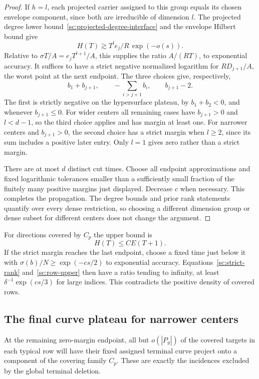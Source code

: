 \begin{proof}
If $h=l$, each projected carrier assigned to this group equals its chosen
envelope component, since both are irreducible of dimension $l$.
The projected degree lower bound~\eqref{sc:projected-degree-interface}
and the envelope Hilbert bound give
\[
 H(T)\gtrsim T^l e_j/R\,\exp(-o(s)).
\]
Relative to $\sigma T/A=e_jT^{l+1}/A$, this supplies the
ratio $A/(RT)$, to exponential accuracy.  It suffices to
have a strict negative normalized logarithm for
$R D_{j+1}/A$, the worst point at the next endpoint.
The three choices give, respectively,
\begin{equation}\label{sc:strict-margins}
 b_1+b_{j+1},\qquad
 -\sum_{i>j+1}b_i,\qquad
 b_{j+1}-2.
\end{equation}
The first is strictly negative on the hypersurface
plateau, by $b_1+b_2<0$, and whenever $b_{j+1}\le0$.
For wider centers all remaining cases have
$b_{j+1}>0$ and $l<d-1$, so the third choice applies and
has margin at least one.  For narrower centers and
$b_{j+1}>0$, the second choice has a strict margin when
$l\ge2$, since its sum includes a positive later entry.
Only $l=1$ gives zero rather than a strict margin.

There are at most $d$ distinct cut times.  Choose all
endpoint approximations and fixed logarithmic tolerances
smaller than a sufficiently small fraction of the
finitely many positive margins just displayed.  Decrease
$c$ when necessary.  This completes the propagation.
The degree bounds and prior rank statements quantify
over every dense restriction, so choosing a different
dimension group or dense subset for different centers
does not change the argument.
\end{proof}

For directions covered by $C_p$ the upper bound is
\begin{equation}\label{sc:row-upper}
 H(T)\le CE(T+1).
\end{equation}
If the strict margin reaches the last endpoint, choose a
fixed time just below it with $\sigma(b)/N\ge\exp(-c s/2)$
to exponential accuracy.  Equations~\eqref{sc:strict-rank}
and~\eqref{sc:row-upper} then have a ratio tending to
infinity, at least $\delta^{-1}\exp(c s/3)$ for large
indices.  This contradicts the positive density of
covered rows.

\subsection{The final curve plateau for narrower centers}

At the remaining zero-margin endpoint, all but $o(|P_y|)$ of the covered
targets in each typical row will have their fixed assigned terminal curve
project onto a component of the covering family $C_p$.  These are exactly
the incidences excluded by the global terminal deletion.

